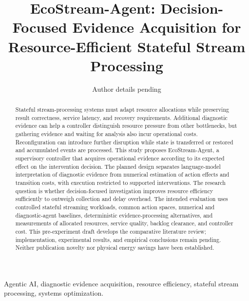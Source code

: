 \documentclass[nolineno]{ieeeaccess}
\begin{document}
\title{EcoStream-Agent: Decision-Focused Evidence Acquisition for Resource-Efficient Stateful Stream Processing}
\author{Author details pending}
\address{Names, affiliations, and author order have not yet been supplied.}

\begin{abstract}
Stateful stream-processing systems must adapt resource allocations while preserving result correctness, service latency, and recovery requirements. Additional diagnostic evidence can help a controller distinguish resource pressure from other bottlenecks, but gathering evidence and waiting for analysis also incur operational costs. Reconfiguration can introduce further disruption while state is transferred or restored and accumulated events are processed. This study proposes EcoStream-Agent, a supervisory controller that acquires operational evidence according to its expected effect on the intervention decision. The planned design separates language-model interpretation of diagnostic evidence from numerical estimation of action effects and transition costs, with execution restricted to supported interventions. The research question is whether decision-focused investigation improves resource efficiency sufficiently to outweigh collection and delay overhead. The intended evaluation uses controlled stateful streaming workloads, common action spaces, numerical and diagnostic-agent baselines, deterministic evidence-processing alternatives, and measurements of allocated resources, service quality, backlog clearance, and controller cost. This pre-experiment draft develops the comparative literature review; implementation, experimental results, and empirical conclusions remain pending. Neither publication novelty nor physical energy savings have been established.
\end{abstract}

\begin{keywords}
Agentic AI, diagnostic evidence acquisition, resource efficiency, stateful stream processing, systems optimization.
\end{keywords}
\titlepgskip=-15pt
\maketitle
\end{document}
